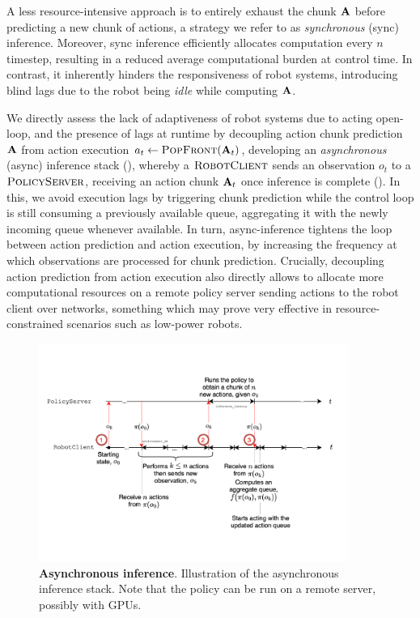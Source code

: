 A less resource-intensive approach is to entirely exhaust the chunk \( \mathbf{A} \) before predicting a new chunk of actions, a strategy we refer to as \textit{synchronous} (sync) inference. 
Moreover, sync inference efficiently allocates computation every \( n \) timestep, resulting in a reduced average computational burden at control time. In contrast, it inherently hinders the responsiveness of robot systems, introducing blind lags due to the robot being \textit{idle} while computing \( \mathbf{A} \).

We directly assess the lack of adaptiveness of robot systems due to acting open-loop, and the presence of lags at runtime by decoupling action chunk prediction \( \mathbf{A} \) from action execution \( a_t \gets \textsc{PopFront}(\mathbf{A}_t) \), developing an \textit{asynchronous} (async) inference stack (), whereby a \( \textsc{RobotClient} \) sends an observation \( o_t \) to a \( \textsc{PolicyServer} \), receiving an action chunk \( \mathbf{A}_t \) once inference is complete ().
In this, we avoid execution lags by triggering chunk prediction while the control loop is still consuming a previously available queue, aggregating it with the newly incoming queue whenever available.
In turn, async-inference tightens the loop between action prediction and action execution, by increasing the frequency at which observations are processed for chunk prediction. 
Crucially, decoupling action prediction from action execution also directly allows to allocate more computational resources on a remote policy server sending actions to the robot client over networks, something which may prove very effective in resource-constrained scenarios such as low-power robots.

\begin{figure}
    \centering
    \begin{minipage}[t]{\textwidth}
        \centering
        \includegraphics[width=0.9\textwidth]{figures/async_inference.pdf}
        \caption{\textbf{Asynchronous inference}. Illustration of the asynchronous inference stack. Note that the policy can be run on a remote server, possibly with GPUs.}
        \label{fig:async-inference}
    \end{minipage}
    \vspace{-0.6cm}
\end{figure}

